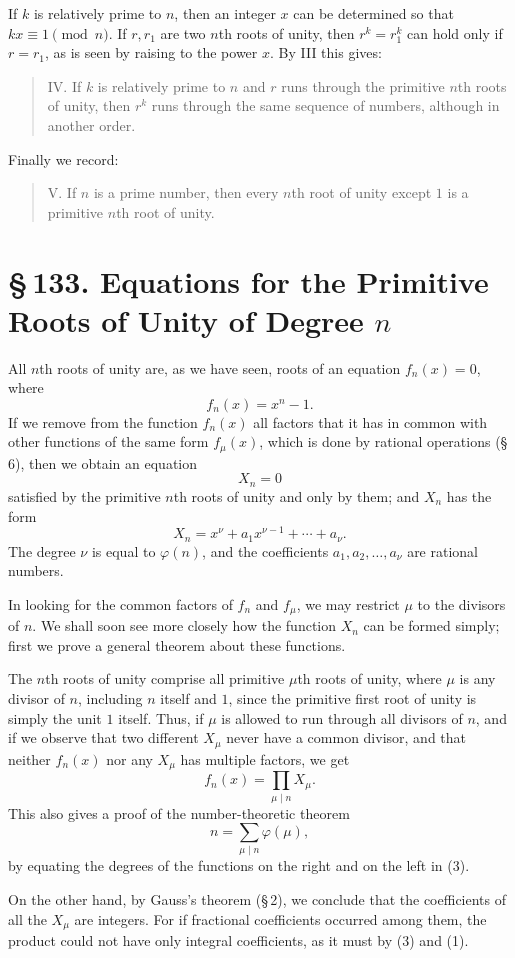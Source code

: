 \documentclass[11pt]{article}
\providecommand{\sect}[2]{\section*{\S\,#1. #2}}
\begin{document}
If $k$ is relatively prime to $n$, then an integer $x$ can be determined so that $kx\equiv1\pmod n$. If $r,r_1$ are two $n$th roots of unity, then $r^k=r_1^k$ can hold only if $r=r_1$, as is seen by raising to the power $x$. By III this gives:
\begin{quote}
IV. If $k$ is relatively prime to $n$ and $r$ runs through the primitive $n$th roots of unity, then $r^k$ runs through the same sequence of numbers, although in another order.
\end{quote}
Finally we record:
\begin{quote}
V. If $n$ is a prime number, then every $n$th root of unity except $1$ is a primitive $n$th root of unity.
\end{quote}

\sect{133}{Equations for the Primitive Roots of Unity of Degree $n$}

All $n$th roots of unity are, as we have seen, roots of an equation $f_n(x)=0$, where
\[
\tag{1}        f_n(x)=x^n-1.
\]
If we remove from the function $f_n(x)$ all factors that it has in common with other functions of the same form $f_\mu(x)$, which is done by rational operations (\S\,6), then we obtain an equation
\[
        X_n=0
\]
satisfied by the primitive $n$th roots of unity and only by them; and $X_n$ has the form
\[
\tag{2}        X_n=x^\nu+a_1x^{\nu-1}+\cdots+a_\nu.
\]
The degree $\nu$ is equal to $\varphi(n)$, and the coefficients $a_1,a_2,\ldots,a_\nu$ are rational numbers.

In looking for the common factors of $f_n$ and $f_\mu$, we may restrict $\mu$ to the divisors of $n$. We shall soon see more closely how the function $X_n$ can be formed simply; first we prove a general theorem about these functions.

The $n$th roots of unity comprise all primitive $\mu$th roots of unity, where $\mu$ is any divisor of $n$, including $n$ itself and $1$, since the primitive first root of unity is simply the unit $1$ itself. Thus, if $\mu$ is allowed to run through all divisors of $n$, and if we observe that two different $X_\mu$ never have a common divisor, and that neither $f_n(x)$ nor any $X_\mu$ has multiple factors, we get
\[
\tag{3}        f_n(x)=\prod_{\mu\mid n}X_\mu.
\]
This also gives a proof of the number-theoretic theorem
\[
\tag{4}        n=\sum_{\mu\mid n}\varphi(\mu),
\]
by equating the degrees of the functions on the right and on the left in (3).

On the other hand, by Gauss's theorem (\S\,2), we conclude that the coefficients of all the $X_\mu$ are integers. For if fractional coefficients occurred among them, the product could not have only integral coefficients, as it must by (3) and (1).
\end{document}
